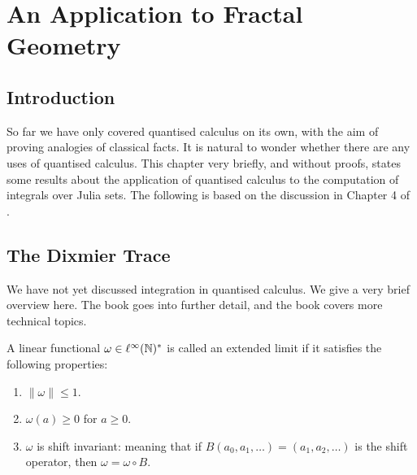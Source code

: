 
\chapter{An Application to Fractal Geometry} %

\label{Applications} %



\section{Introduction}
So far we have only covered quantised calculus on its own, 
with the aim of proving analogies of classical facts. It is natural
to wonder whether there are any uses of quantised calculus. This
chapter very briefly, and without proofs, states
some results about the application of quantised calculus to the computation
of integrals over Julia sets. The following is based on the discussion 
in Chapter 4 of \cite{Connes94}.

\section{The Dixmier Trace}
We have not yet discussed integration in quantised calculus. We give
a very brief overview here. The book \cite{Connes94} goes into further
detail, and the book \cite{SingularTraces} covers more technical topics.

\begin{definition}
    A linear functional $\omega \in \ell^\infty(\mathbb{N})^*$ is called an extended
    limit if it satisfies the following properties:
    \begin{enumerate}
        \item{} $\|\omega\| \leq 1$.
        \item{} $\omega(a) \geq 0$ for $a \geq 0$.
        \item{} $\omega$ is shift invariant: meaning that if $B(a_0,a_1,\ldots) = (a_1,a_2,\ldots)$
        is the shift operator, then $\omega = \omega\circ B$.
    \end{enumerate}
\end{definition}    

